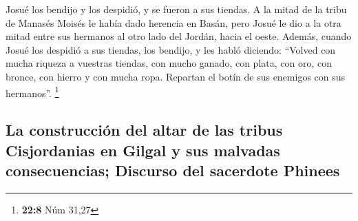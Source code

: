 \begin{paracol}{2}
 Josué los bendijo y los despidió, y se fueron a sus
tiendas.  A la mitad de la tribu de Manasés Moisés le
había dado herencia en Basán, pero Josué le dio a la otra mitad entre
sus hermanos al otro lado del Jordán, hacia el oeste. Además, cuando
Josué los despidió a sus tiendas, los bendijo,  y les
habló diciendo: ``Volved con mucha riqueza a vuestras tiendas, con mucho
ganado, con plata, con oro, con bronce, con hierro y con mucha ropa.
Repartan el botín de sus enemigos con sus hermanos''. \footnote{\textbf{22:8}
  Núm 31,27}

\hypertarget{la-construcciuxf3n-del-altar-de-las-tribus-cisjordanias-en-gilgal-y-sus-malvadas-consecuencias-discurso-del-sacerdote-phinees}{%
\subsection{La construcción del altar de las tribus Cisjordanias en
Gilgal y sus malvadas consecuencias; Discurso del sacerdote
Phinees}\label{la-construcciuxf3n-del-altar-de-las-tribus-cisjordanias-en-gilgal-y-sus-malvadas-consecuencias-discurso-del-sacerdote-phinees}}


\end{paracol}
